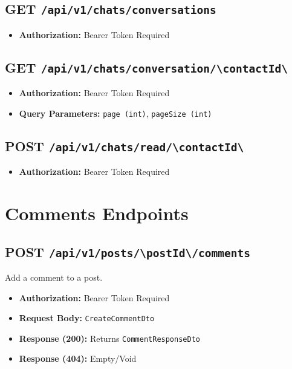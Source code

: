 \subsection{GET \texttt{/api/v1/chats/conversations}}
\begin{itemize}
    \item \textbf{Authorization:} Bearer Token Required
\end{itemize}

\subsection{GET \texttt{/api/v1/chats/conversation/\textbackslash{}{contactId\textbackslash{}}}}
\begin{itemize}
    \item \textbf{Authorization:} Bearer Token Required
    \item \textbf{Query Parameters:} \texttt{page (int)}, \texttt{pageSize (int)}
\end{itemize}

\subsection{POST \texttt{/api/v1/chats/read/\textbackslash{}{contactId\textbackslash{}}}}
\begin{itemize}
    \item \textbf{Authorization:} Bearer Token Required
\end{itemize}

\section{Comments Endpoints}

\subsection{POST \texttt{/api/v1/posts/\textbackslash{}{postId\textbackslash{}}/comments}}
Add a comment to a post.
\begin{itemize}
    \item \textbf{Authorization:} Bearer Token Required
    \item \textbf{Request Body:} \texttt{CreateCommentDto}
    \item \textbf{Response (200):} Returns \texttt{CommentResponseDto}
    \item \textbf{Response (404):} Empty/Void
\end{itemize}

